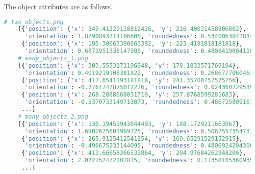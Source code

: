 \documentclass{article}
\begin{document}
\hspace{-1.8em}
The object attributes are as follows.

\small
\begin{lstlisting}[language=python]
    # two_objects.png
    [{'position': {'x': 349.41329138812426, 'y': 216.40031458906802},
      'orientation': 1.8790893714106605, 'roundedness': 0.5340063842834148}, 
     {'position': {'x': 195.30663390663392, 'y': 223.4181818181818},
      'orientation': 0.6871951338147986, 'roundedness': 0.4808419004110274}]
    # many_objects_1.png
    [{'position': {'x': 303.5553171196948, 'y': 178.1833571769194},
      'orientation': 0.4019219108381822, 'roundedness': 0.26867770604637214}, 
     {'position': {'x': 417.6541193181818, 'y': 241.35700757575756}, 
      'orientation': -0.7761742875012226, 'roundedness': 0.024360729539394724}, 
     {'position': {'x': 268.2888660851719, 'y': 257.8768599281683},
      'orientation': -0.5370733149713873, 'roundedness': 0.48672580916164937}, 
     ...]
    # many_objects_2.png
    [{'position': {'x': 130.19451943844493, 'y': 188.1729211663067}, 
      'orientation': 1.6902675601989725, 'roundedness': 0.5062557354731094}, 
     {'position': {'x': 265.9125412541254, 'y': 169.65291529152915}, 
      'orientation': -0.496675233144095, 'roundedness': 0.4806924204306065},
     {'position': {'x': 413.66658366533864, 'y': 204.97684262948206},
      'orientation': 2.022752472102815, 'roundedness': 0.17358105360935486},
     ...]
\end{lstlisting}
\normalsize
\end{document}
